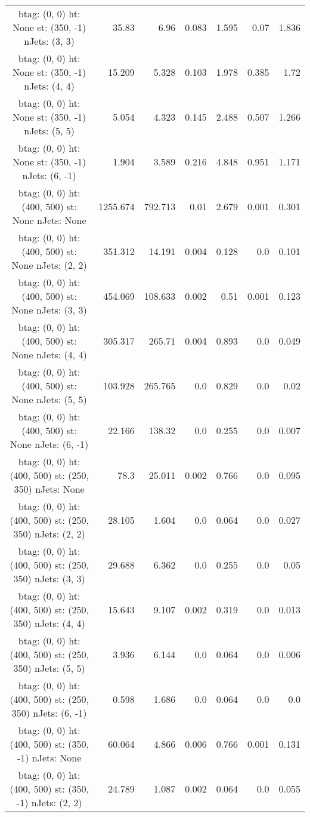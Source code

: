 \documentclass[12pt]{paper}
\begin{document}
\begin{landscape}
\begin{longtable}{c|r|r|r|r|r|r}
btag:  (0, 0) ht:  None st:  (350, -1) nJets:  (3, 3)
 & 35.83 & 6.96 & 0.083 & 1.595 & 0.07 & 1.836\\
btag:  (0, 0) ht:  None st:  (350, -1) nJets:  (4, 4)
 & 15.209 & 5.328 & 0.103 & 1.978 & 0.385 & 1.72\\
btag:  (0, 0) ht:  None st:  (350, -1) nJets:  (5, 5)
 & 5.054 & 4.323 & 0.145 & 2.488 & 0.507 & 1.266\\
btag:  (0, 0) ht:  None st:  (350, -1) nJets:  (6, -1)
 & 1.904 & 3.589 & 0.216 & 4.848 & 0.951 & 1.171\\
btag:  (0, 0) ht:  (400, 500) st:  None nJets:  None
 & 1255.674 & 792.713 & 0.01 & 2.679 & 0.001 & 0.301\\
btag:  (0, 0) ht:  (400, 500) st:  None nJets:  (2, 2)
 & 351.312 & 14.191 & 0.004 & 0.128 & 0.0 & 0.101\\
btag:  (0, 0) ht:  (400, 500) st:  None nJets:  (3, 3)
 & 454.069 & 108.633 & 0.002 & 0.51 & 0.001 & 0.123\\
btag:  (0, 0) ht:  (400, 500) st:  None nJets:  (4, 4)
 & 305.317 & 265.71 & 0.004 & 0.893 & 0.0 & 0.049\\
btag:  (0, 0) ht:  (400, 500) st:  None nJets:  (5, 5)
 & 103.928 & 265.765 & 0.0 & 0.829 & 0.0 & 0.02\\
btag:  (0, 0) ht:  (400, 500) st:  None nJets:  (6, -1)
 & 22.166 & 138.32 & 0.0 & 0.255 & 0.0 & 0.007\\
btag:  (0, 0) ht:  (400, 500) st:  (250, 350) nJets:  None
 & 78.3 & 25.011 & 0.002 & 0.766 & 0.0 & 0.095\\
btag:  (0, 0) ht:  (400, 500) st:  (250, 350) nJets:  (2, 2)
 & 28.105 & 1.604 & 0.0 & 0.064 & 0.0 & 0.027\\
btag:  (0, 0) ht:  (400, 500) st:  (250, 350) nJets:  (3, 3)
 & 29.688 & 6.362 & 0.0 & 0.255 & 0.0 & 0.05\\
btag:  (0, 0) ht:  (400, 500) st:  (250, 350) nJets:  (4, 4)
 & 15.643 & 9.107 & 0.002 & 0.319 & 0.0 & 0.013\\
btag:  (0, 0) ht:  (400, 500) st:  (250, 350) nJets:  (5, 5)
 & 3.936 & 6.144 & 0.0 & 0.064 & 0.0 & 0.006\\
btag:  (0, 0) ht:  (400, 500) st:  (250, 350) nJets:  (6, -1)
 & 0.598 & 1.686 & 0.0 & 0.064 & 0.0 & 0.0\\
btag:  (0, 0) ht:  (400, 500) st:  (350, -1) nJets:  None
 & 60.064 & 4.866 & 0.006 & 0.766 & 0.001 & 0.131\\
btag:  (0, 0) ht:  (400, 500) st:  (350, -1) nJets:  (2, 2)
 & 24.789 & 1.087 & 0.002 & 0.064 & 0.0 & 0.055\\

\end{longtable}
\end{landscape}
\end{document}

